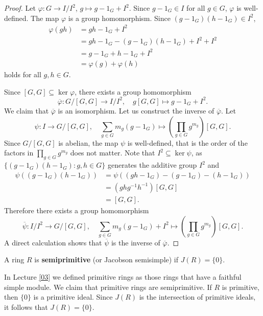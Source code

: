 \begin{proof}
    Let $\varphi\colon G\to I/I^2$, $g\mapsto g-1_G+I^2$. Since $g-1_G\in I$ for all $g\in G$, $\varphi$ is well-defined. The map $\varphi$ is a group homomorphism. Since 
    $(g-1_G)(h-1_G)\in I^2$, 
    \begin{align*}
    \varphi(gh) &= gh-1_G+I^2\\
    &=gh-1_G-(g-1_G)(h-1_G)+I^2+I^2\\
    &=g-1_G+h-1_G+I^2\\
    &=\varphi(g)+\varphi(h)
    \end{align*}
    holds for all $g,h\in G$. 

    Since $[G,G]\subseteq\ker\varphi$, there exists a group homomorphism
    \[
    \overline{\varphi}\colon G/[G,G]\to I/I^2,\quad 
    g[G,G]\mapsto g-1_G+I^2.
    \]
    We claim that $\overline{\varphi}$ is an isomorphism. 
    Let us construct the inverse of $\overline{\varphi}$. Let 
    \[
    \psi\colon I\to G/[G,G],\quad 
    \sum_{g\in G}m_g(g-1_G)\mapsto \left(\prod_{g\in G}g^{m_g}\right)[G,G].
    \]
    Since $G/[G,G]$ is abelian, the map $\psi$ is well-defined, that is
    the order of the factors in $\prod_{g\in G}g^{m_g}$ does not matter. Note that 
    $I^2\subseteq\ker\psi$, as 
    $\{(g-1_G)(h-1_G):g,h\in G\}$ generates the additive group $I^2$ 
    and 
    \begin{align*}
        \psi((g-1_G)(h-1_G))&=\psi( (gh-1_G)-(g-1_G)-(h-1_G))\\
        &=(ghg^{-1}h^{-1})[G,G]\\
        &=[G,G].
    \end{align*}
    Therefore there exists a group homomorphism
    \[
    \overline{\psi}\colon I/I^2\to G/[G,G],\quad 
    \sum_{g\in G}m_g(g-1_G)+I^2\mapsto \left(\prod_{g\in G}g^{m_g}\right)[G,G].
    \]
    A direct calculation shows that $\overline{\psi}$ is the inverse 
    of $\overline{\varphi}$. 
\end{proof}


\begin{definition}
	A ring $R$ is \textbf{semiprimitive} (or Jacobson semisimple) if  $J(R)=\{0\}$.
\end{definition}

In Lecture \ref{03} we defined primitive rings as
those rings that have a faithful simple module.  We claim that primitive rings
are semiprimitive. If $R$ is primitive, then $\{0\}$ is a primitive ideal. Since
$J(R)$ is the intersection of primitive ideals, it follows that $J(R)=\{0\}$.

